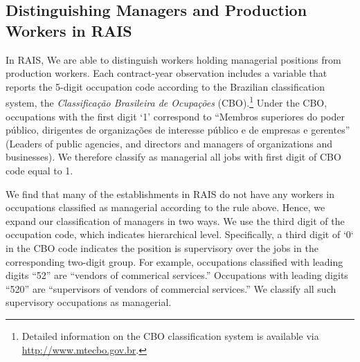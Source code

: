 \subsection{Distinguishing Managers and Production Workers in RAIS}
In RAIS, We are able to distinguish workers holding managerial positions from production workers.
Each contract-year observation includes a variable that reports the 5-digit occupation code according to the Brazilian classification system, the \emph{Classificaç{\~a}o Brasileira de Ocupaç{\~o}es} (CBO).\footnote{Detailed information on the CBO classification system is available via \href{http://www.mtecbo.gov.br}{http://www.mtecbo.gov.br}.} 
Under the CBO, occupations with the first digit `1' correspond to  ``Membros superiores do poder p\'{u}blico, dirigentes de organiza\c{c}\~{o}es
 de interesse p\'{u}blico e de empresas e gerentes'' (Leaders of public agencies, and directors and managers of organizations and businesses). We therefore classify as managerial all jobs with first digit of CBO code equal to 1.

 We find that many of the establishments in RAIS do not have any workers in occupations classified as managerial according to the rule above. Hence, we expand our classification of managers in two ways.  We use the third digit of the occupation code, which indicates hierarchical level. Specifically, a third digit of `0` in the CBO code indicates the position is supervisory over the jobs in the corresponding two-digit group. For example, occupations classified with leading digits ``52'' are ``vendors of commerical services.'' Occupations with leading digits ``520'' are ``supervisors of vendors of commercial services.'' We classify all such supervisory occupations as managerial. %
  
   
 


